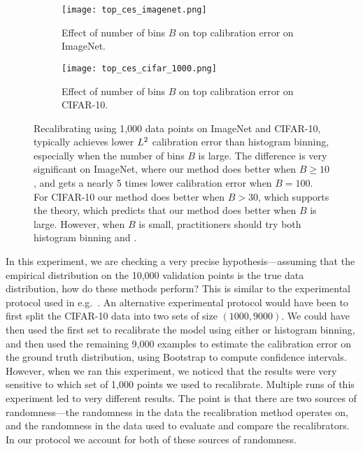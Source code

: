 \begin{figure}
  \centering
  \centering
  	 \begin{subfigure}[b]{0.48\textwidth}
         \centering
         \texttt{[image: top\_ces\_imagenet.png]}
         \caption{Effect of number of bins $B$ on top calibration error on ImageNet.
         }
         \label{fig:imagenet_top_cal_var_red}
     \end{subfigure}
     \hfill
     \begin{subfigure}[b]{0.48\textwidth}
         \centering
         \texttt{[image: top\_ces\_cifar\_1000.png]}
         \caption{Effect of number of bins $B$ on top calibration error on CIFAR-10.
         }
         \label{fig:cifar_top_cal_var_red}
     \end{subfigure}
  \caption{
    Recalibrating using 1,000 data points on ImageNet and CIFAR-10, \ourcal{} typically achieves lower $L^2$ calibration error than histogram binning, especially when the number of bins $B$ is large. The difference is very significant on ImageNet, where our method does better when $B \geq 10$, and gets a nearly 5 times lower calibration error when $B = 100$. For CIFAR-10 our method does better when $B > 30$, which supports the theory, which predicts that our method does better when $B$ is large. However, when $B$ is small, practitioners should try both histogram binning and \ourcal{}.
}
  \label{fig:mse_estimators_bins}
\end{figure}

In this experiment, we are checking a very precise hypothesis---assuming that the empirical distribution on the 10,000 validation points is the true data distribution, how do these methods perform? This is similar to the experimental protocol used in e.g.~\cite{brocker2012empirical}.
An alternative experimental protocol would have been to first split the CIFAR-10 data into two sets of size $(1000, 9000)$.
We could have then used the first set to recalibrate the model using either \ourcal{} or histogram binning, and then used the remaining 9,000 examples to estimate the calibration error on the ground truth distribution, using Bootstrap to compute confidence intervals.
However, when we ran this experiment, we noticed that the results were very sensitive to which set of 1,000 points we used to recalibrate.
Multiple runs of this experiment led to very different results.
The point is that there are two sources of randomness---the randomness in the data the recalibration method operates on, and the randomness in the data used to evaluate and compare the recalibrators.
In our protocol we account for both of these sources of randomness.

